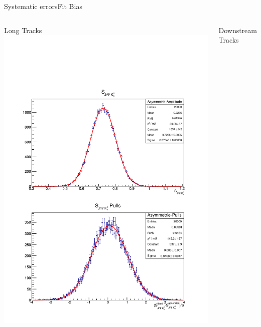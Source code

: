 \documentclass{beamer}
\begin{document}
	\begin{frame}{Systematic errors}{Fit Bias}
	\begin{columns}
	\begin{block}{Long Tracks}
	\centering
	\includegraphics[width=\textwidth]{fit_bias_lt}	
	\end{block}
	\begin{block}{Downstream Tracks}
	\centering

\end{block}
\end{columns}
\end{frame}
\end{document}
